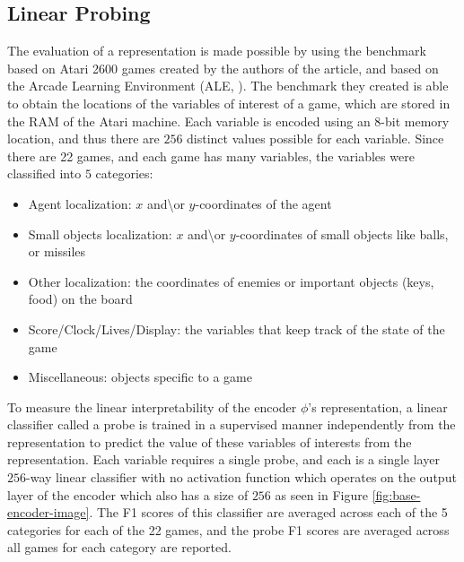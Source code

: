 \documentclass{article}
\begin{document}
\subsection{Linear Probing}
The evaluation of a representation is made possible by using the benchmark based on Atari 2600 games created by the authors of the article, and based on the Arcade Learning Environment (ALE, \cite{ALE}). The benchmark they created is able to obtain the locations of the variables of interest of a game, which are stored in the RAM of the Atari machine. Each variable is encoded using an $8$-bit memory location, and thus there are $256$ distinct values possible for each variable. Since there are 22 games, and each game has many variables, the variables were classified into $5$ categories: 
\begin{itemize}
    \item Agent localization: $x$ and\textbackslash or $y$-coordinates of the agent
    \item Small objects localization: $x$ and\textbackslash or $y$-coordinates of small objects like balls, or missiles
    \item Other localization: the coordinates of enemies or important objects  (keys, food) on the board
    \item Score/Clock/Lives/Display: the variables that keep track of the state of the game
    \item Miscellaneous: objects specific to a game
\end{itemize}

To measure the linear interpretability of the encoder $\phi$'s representation, a linear classifier called a probe is trained in a supervised manner independently from the representation to predict the value of these variables of interests from the representation. Each variable requires a single probe, and each is a single layer $256$-way linear classifier with no activation function which operates on the output layer of the encoder which also has a size of $256$ as seen in Figure \ref{fig:base-encoder-image}. The F1 scores of this classifier are averaged across each of the 5 categories for each of the 22 games, and the probe F1 scores are averaged across all games for each category are reported.
\end{document}

